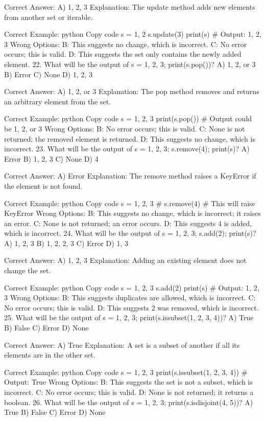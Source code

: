 Correct Answer: A) {1, 2, 3}
Explanation: The update method adds new elements from another set or iterable.

Correct Example:
python
Copy code
s = {1, 2}
s.update({3})
print(s)  # Output: {1, 2, 3}
Wrong Options:
B: This suggests no change, which is incorrect.
C: No error occurs; this is valid.
D: This suggests the set only contains the newly added element.
22. What will be the output of s = {1, 2, 3}; print(s.pop())?
A) 1, 2, or 3
B) Error
C) None
D) {1, 2, 3}

Correct Answer: A) 1, 2, or 3
Explanation: The pop method removes and returns an arbitrary element from the set.

Correct Example:
python
Copy code
s = {1, 2, 3}
print(s.pop())  # Output could be 1, 2, or 3
Wrong Options:
B: No error occurs; this is valid.
C: None is not returned; the removed element is returned.
D: This suggests no change, which is incorrect.
23. What will be the output of s = {1, 2, 3}; s.remove(4); print(s)?
A) Error
B) {1, 2, 3}
C) None
D) {4}

Correct Answer: A) Error
Explanation: The remove method raises a KeyError if the element is not found.

Correct Example:
python
Copy code
s = {1, 2, 3}
# s.remove(4)  # This will raise KeyError
Wrong Options:
B: This suggests no change, which is incorrect; it raises an error.
C: None is not returned; an error occurs.
D: This suggests 4 is added, which is incorrect.
24. What will be the output of s = {1, 2, 3}; s.add(2); print(s)?
A) {1, 2, 3}
B) {1, 2, 2, 3}
C) Error
D) {1, 3}

Correct Answer: A) {1, 2, 3}
Explanation: Adding an existing element does not change the set.

Correct Example:
python
Copy code
s = {1, 2, 3}
s.add(2)
print(s)  # Output: {1, 2, 3}
Wrong Options:
B: This suggests duplicates are allowed, which is incorrect.
C: No error occurs; this is valid.
D: This suggests 2 was removed, which is incorrect.
25. What will be the output of s = {1, 2, 3}; print(s.issubset({1, 2, 3, 4}))?
A) True
B) False
C) Error
D) None

Correct Answer: A) True
Explanation: A set is a subset of another if all its elements are in the other set.

Correct Example:
python
Copy code
s = {1, 2, 3}
print(s.issubset({1, 2, 3, 4}))  # Output: True
Wrong Options:
B: This suggests the set is not a subset, which is incorrect.
C: No error occurs; this is valid.
D: None is not returned; it returns a boolean.
26. What will be the output of s = {1, 2, 3}; print(s.isdisjoint({4, 5}))?
A) True
B) False
C) Error
D) None

